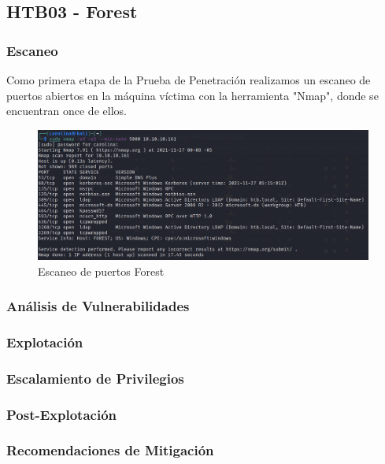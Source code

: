 \subsection{HTB03 - Forest}

    \subsubsection{Escaneo}
        \large{Como primera etapa de la Prueba de Penetración realizamos un escaneo de puertos abiertos en la máquina víctima con la herramienta "Nmap", donde se encuentran once de ellos.}
        \par
        \begin{figure}[h!]
            \centering
            \includegraphics[width=0.99\textwidth]{imagenes/forest/01_nmap_forest.png}
            \caption{Escaneo de puertos Forest} 
        \end{figure}  

    \subsubsection{Análisis de Vulnerabilidades}

    \subsubsection{Explotación}

    \subsubsection{Escalamiento de Privilegios}

    \subsubsection{Post-Explotación}

    \subsubsection{Recomendaciones de Mitigación}
